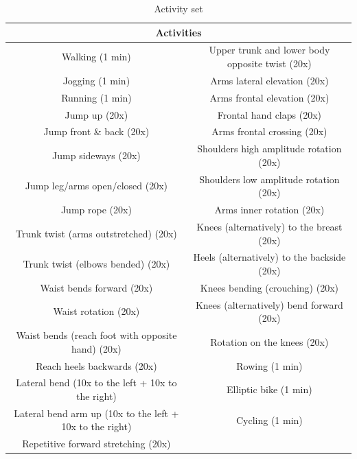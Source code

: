 \begin{table}[h!]
\tiny  
  \centering
\begin{tabular}{|c|c|}
\hline 
\multicolumn{2}{|c|}{Activities}\tabularnewline
\hline 
\hline 
Walking (1 min) & Upper trunk and lower body opposite twist (20x)\tabularnewline
\hline 
Jogging (1 min) & Arms lateral elevation (20x)\tabularnewline
\hline 
Running (1 min) & Arms frontal elevation (20x)\tabularnewline
\hline 
Jump up (20x) & Frontal hand claps (20x)\tabularnewline
\hline 
Jump front \& back (20x) & Arms frontal crossing (20x)\tabularnewline
\hline 
Jump sideways (20x) & Shoulders high amplitude rotation (20x)\tabularnewline
\hline 
Jump leg/arms open/closed (20x) & Shoulders low amplitude rotation (20x)\tabularnewline
\hline 
Jump rope (20x) & Arms inner rotation (20x)\tabularnewline
\hline 
Trunk twist (arms outstretched) (20x) & Knees (alternatively) to the breast (20x)\tabularnewline
\hline 
Trunk twist (elbows bended) (20x) & Heels (alternatively) to the backside (20x)\tabularnewline
\hline 
Waist bends forward (20x) & Knees bending (crouching) (20x)\tabularnewline
\hline 
Waist rotation (20x) & Knees (alternatively) bend forward (20x)\tabularnewline
\hline 
Waist bends (reach foot with opposite hand) (20x) & Rotation on the knees (20x)\tabularnewline
\hline 
Reach heels backwards (20x) & Rowing (1 min)\tabularnewline
\hline 
Lateral bend (10x to the left + 10x to the right) & Elliptic bike (1 min)\tabularnewline
\hline 
Lateral bend arm up (10x to the left + 10x to the right) & Cycling (1 min)\tabularnewline
\hline 
Repetitive forward stretching (20x) & \tabularnewline
\hline 
\end{tabular}

        \caption{Activity set }
        \label{tab:Activites}

\end{table} 


